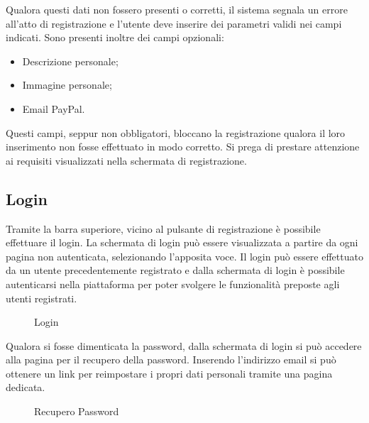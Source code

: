 Qualora questi dati non fossero presenti o corretti, il sistema segnala un errore all'atto di registrazione e l'utente deve inserire dei parametri validi nei campi indicati. Sono presenti inoltre dei campi opzionali:

\begin{itemize}
	\item Descrizione personale;
	\item Immagine personale;
	\item Email PayPal.
\end{itemize}

Questi campi, seppur non obbligatori, bloccano la registrazione qualora il loro inserimento non fosse effettuato in modo corretto. Si prega di prestare attenzione ai requisiti visualizzati nella schermata di registrazione.

\subsection{Login}

Tramite la barra superiore, vicino al pulsante di registrazione è possibile effettuare il login. La schermata di login può essere visualizzata a partire da ogni pagina non autenticata, selezionando l'apposita voce.
Il login può essere effettuato da un utente precedentemente registrato e dalla schermata di login è possibile autenticarsi nella piattaforma per poter svolgere le funzionalità preposte agli utenti registrati. 

\label{Login}
\begin{figure}[H]
	\centering
	\caption{Login}
\end{figure}

Qualora si fosse dimenticata la password, dalla schermata di login si può accedere alla pagina per il recupero della password. Inserendo l'indirizzo email si può ottenere un link per reimpostare i propri dati personali tramite una pagina dedicata. 

\label{Recupero Password}
\begin{figure}[H]
	\centering
	\caption{Recupero Password}
\end{figure}
